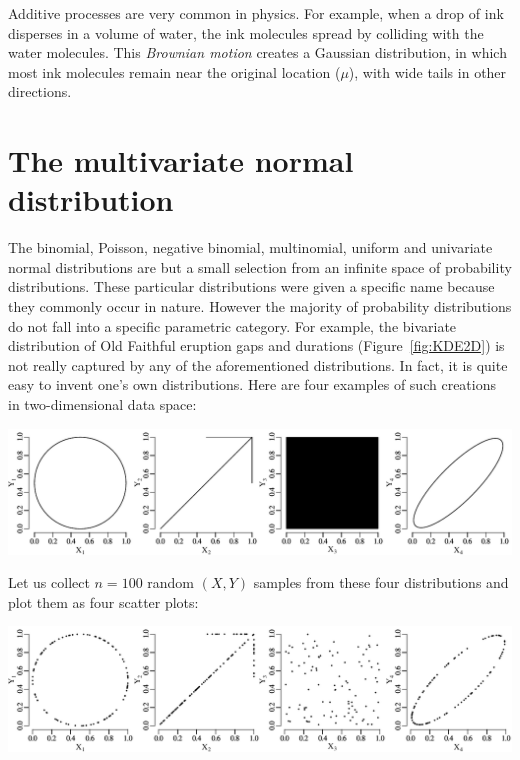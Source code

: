 Additive processes are very common in physics. For example, when a
drop of ink disperses in a volume of water, the ink molecules spread
by colliding with the water molecules.  This \emph{Brownian motion}
creates a Gaussian distribution, in which most ink molecules remain
near the original location ($\mu$), with wide tails in other
directions.

\section{The multivariate normal distribution}
\label{sec:multinorm}

The binomial, Poisson, negative binomial, multinomial, uniform and
univariate normal distributions are but a small selection from an
infinite space of probability distributions. These particular
distributions were given a specific name because they commonly occur
in nature.  However the majority of probability distributions do not
fall into a specific parametric category.  For example, the bivariate
distribution of Old Faithful eruption gaps and durations
(Figure~\ref{fig:KDE2D}) is not really captured by any of the
aforementioned distributions. In fact, it is quite easy to invent
one's own distributions. Here are four examples of such creations in
two-dimensional data space:\medskip

\noindent\includegraphics[width=\textwidth]{../figures/pop2d.pdf}
\begingroup {}
\label{fig:pop2d}
\endgroup

Let us collect $n=100$ random $(X,Y)$ samples from these four
distributions and plot them as four scatter plots:\medskip

\noindent\includegraphics[width=\textwidth]{../figures/rand2d.pdf}
\begingroup {}
\label{fig:rand2d}
\endgroup

